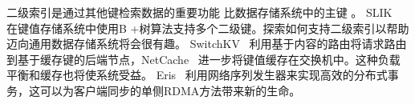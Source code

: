 二级索引是通过其他键检索数据的重要功能
比数据存储系统中的主键 \cite {escriva2012hyperdex,kejriwal2016slik}。 SLIK~ \cite {kejriwal2016slik}在键值存储系统中使用B +树算法支持多个二级键。探索如何支持二级索引以帮助 \oursys{} 迈向通用数据存储系统将会很有趣。 SwitchKV~ \cite {li2016fast}利用基于内容的路由将请求路由到基于缓存键的后端节点，NetCache~ \cite {netcache-sosp17}进一步将键值缓存在交换机中。这种负载平衡和缓存也将使系统受益。
Eris~ \cite {eris}利用网络序列发生器来实现高效的分布式事务，这可以为客户端同步的单侧RDMA方法带来新的生命。











